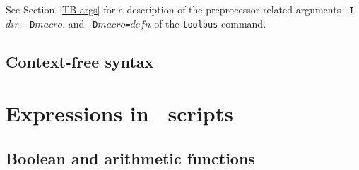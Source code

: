\documentclass[a4,twoside,noweb]{article} %
\begin{document}
See Section~\ref{TB-args} for a description
of the preprocessor related arguments {\tt -I$dir$}, {\tt -D$macro$}, and
{\tt -D$macro$=$defn$} of the {\tt toolbus} command.

\subsection{Context-free syntax}

  
\newpage
\section{\label{AppExpr}Expressions in \T\ scripts}

\subsection{Boolean and arithmetic functions}
\end{document}

